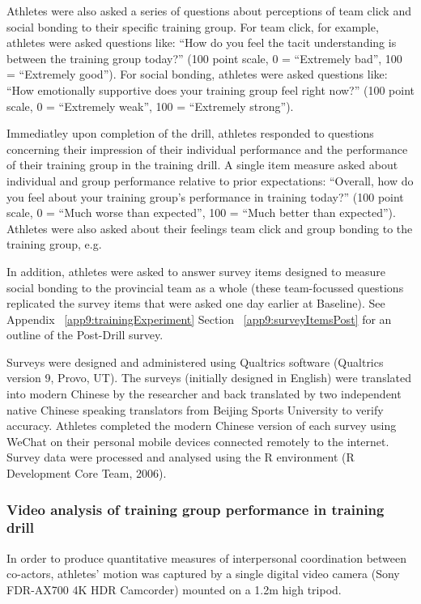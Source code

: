 Athletes were also asked a series of questions about perceptions of team click and social bonding to their specific training group. For team click, for example, athletes were asked questions like: ``How do you feel the tacit understanding is between the training group today?'' (100 point scale, 0 = ``Extremely bad'', 100 = ``Extremely good'').  For social bonding, athletes were asked questions like: ``How emotionally supportive does your training group feel right now?'' (100 point scale, 0 = ``Extremely weak'', 100 = ``Extremely strong'').


Immediatley upon completion of the drill, athletes responded to questions concerning their impression of their individual performance and the performance of their training group in the training drill. A  single item measure asked about individual and group performance relative to prior expectations: ``Overall, how do you feel about your training group's performance in training today?'' (100 point scale, 0 = ``Much worse than expected'', 100 = ``Much better than expected'').  Athletes were also asked about their feelings team click and group bonding to the training group, e.g.

In addition, athletes were asked to answer survey items designed to measure social bonding to the provincial team as a whole (these team-focussed questions replicated the survey items that were asked one day earlier at Baseline).  See Appendix ~\ref{app9:trainingExperiment} Section ~\ref{app9:surveyItemsPost} for an outline of the Post-Drill survey.

Surveys were designed and administered using Qualtrics software (Qualtrics version 9, Provo, UT). The surveys (initially designed in English) were translated into modern Chinese by the researcher and back translated by two independent native Chinese speaking translators from Beijing Sports University to verify accuracy.  Athletes completed the modern Chinese version of each survey using WeChat on their personal mobile devices connected remotely to the internet. Survey data were processed and analysed using the R environment (R Development Core Team, 2006).

\subsubsection{Video analysis of training group performance in training drill\label{sec:videoAnalysis}}
In order to produce quantitative measures of interpersonal coordination between co-actors, athletes’ motion was captured by a single digital video camera (Sony FDR-AX700 4K HDR Camcorder) mounted on a 1.2m high tripod.

